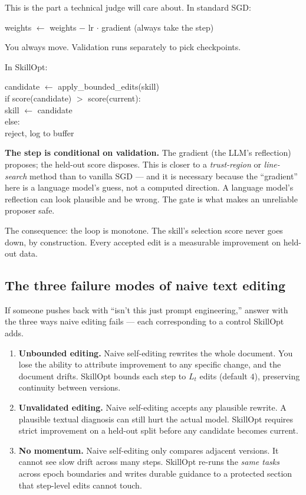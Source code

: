 \documentclass[11pt,a4paper]{article}
\begin{document}
This is the part a technical judge will care about. In standard SGD:

\begin{promptbox}
weights \(\leftarrow\) weights \(-\) lr \(\cdot\) gradient
\hfill (always take the step)
\end{promptbox}

You always move. Validation runs separately to pick checkpoints.

In SkillOpt:

\begin{promptbox}
candidate \(\leftarrow\) apply\_bounded\_edits(skill)\\
if score(candidate) \(>\) score(current):\\
\hspace*{2em}skill \(\leftarrow\) candidate\\
else:\\
\hspace*{2em}reject, log to buffer
\end{promptbox}

\textbf{The step is conditional on validation.} The gradient (the
LLM's reflection) proposes; the held-out score disposes. This is closer
to a \emph{trust-region} or \emph{line-search} method than to vanilla
SGD --- and it is necessary because the ``gradient'' here is a language
model's guess, not a computed direction. A language model's reflection
can look plausible and be wrong. The gate is what makes an unreliable
proposer safe.

The consequence: the loop is monotone. The skill's selection score
never goes down, by construction. Every accepted edit is a measurable
improvement on held-out data.

\subsection{The three failure modes of naive text editing}

If someone pushes back with ``isn't this just prompt engineering,''
answer with the three ways naive editing fails --- each corresponding
to a control SkillOpt adds.

\begin{enumerate}[leftmargin=1.4em]
  \item \textbf{Unbounded editing.} Naive self-editing rewrites the
  whole document. You lose the ability to attribute improvement to any
  specific change, and the document drifts. SkillOpt bounds each step
  to \(L_t\) edits (default \(4\)), preserving continuity between
  versions.
  \item \textbf{Unvalidated editing.} Naive self-editing accepts any
  plausible rewrite. A plausible textual diagnosis can still hurt the
  actual model. SkillOpt requires strict improvement on a held-out
  split before any candidate becomes current.
  \item \textbf{No momentum.} Naive self-editing only compares adjacent
  versions. It cannot see slow drift across many steps. SkillOpt re-runs
  the \emph{same tasks} across epoch boundaries and writes durable
  guidance to a protected section that step-level edits cannot touch.
\end{enumerate}
\end{document}
